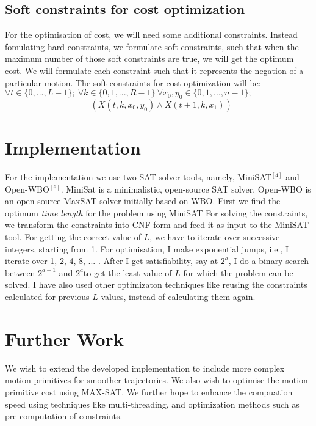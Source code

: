 \documentclass{article}[11pt]
\begin{document}
			\subsection{Soft constraints for cost optimization}
				For the optimisation of cost, we will need some additional constraints. Instead fomulating hard constraints, we formulate soft constraints, such that when the maximum number of those soft constraints are true, we will get the optimum cost.
				We will formulate each constraint such that it represents the negation of a particular motion.
				The soft constraints for cost optimization will be:\\
				$\forall t \in \{0, ..., L-1\};\ \forall k \in \{0, 1, ..., R-1\}\ \forall x_0,y_0 \in \{0,1,...,n-1\};$
				$$
					\neg(X(t, k, x_0, y_0) \wedge X(t+1, k, x_1))
				$$


	\section{Implementation}
		For the implementation we use two SAT solver tools, namely, MiniSAT$^[4]$ and Open-WBO$^[6]$. MiniSat is a minimalistic, open-source SAT solver. Open-WBO is an open source MaxSAT solver initially based on WBO.
		First we find the optimum \textit{time length} for the problem using MiniSAT
		For solving the constraints, we transform the constraints into CNF form and feed it as input to the MiniSAT tool. For getting the correct value of $L$, we have to iterate over successive integers, starting from 1. For optimisation, I make exponential jumps, i.e., I iterate over 1, 2, 4, 8, ... . After I get satisfiability, say at $2^a$, I do a binary search between $2^{a-1}$ and $2^a$to get the least value of $L$ for which the problem can be solved. I have also used other optimizaton techniques like reusing the constraints calculated for previous $L$ values, instead of calculating them again.

	\section{Further Work}
		We wish to extend the developed implementation to include more complex motion primitives for smoother trajectories. We also wish to optimise the motion primitive cost using MAX-SAT. We further hope to enhance the compuation speed using techniques like multi-threading, and optimization methods such as pre-computation of constraints.
\end{document}

